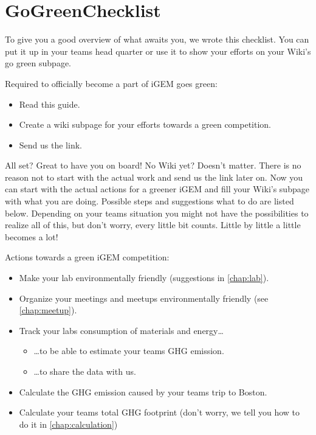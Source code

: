 \section{GoGreenChecklist}\label{checklist}
To give you a good overview of what awaits you, we wrote this checklist. You can put it up in your teams head quarter or use it to show your efforts on your Wiki's go green subpage.
\bigskip
{\renewcommand{\labelitemi}{\tickleaf}
\begin{checklistbox}
{\sffamily\textcolor{ocre}{Required to officially become a part of iGEM goes green:}}
\begin{itemize}
	\setlength{\itemsep}{-0.5\parsep}
	\item[\tickleafticked] Read this guide.
	\item Create a wiki subpage for your efforts towards a green competition.%
	\item Send us the link.
\end{itemize}
\end{checklistbox}
\bigskip
All set? Great to have you on board! No Wiki yet? Doesn't matter. There is no reason not to start with the actual work and send us the link later on. Now you can start with the actual actions for a greener iGEM and fill your Wiki's subpage with what you are doing. Possible steps and suggestions what to do are listed below. Depending on your teams situation you might not have the possibilities to realize all of this, but don't worry, every little bit counts. Little by little a little becomes a lot!
\bigskip
\begin{checklistbox}
{\sffamily\textcolor{ocre}{Actions towards a green iGEM competition:}}
\begin{itemize}
	\setlength{\itemsep}{-0.5\parsep}
	\item Make your lab environmentally friendly (suggestions in \cref{chap:lab}).
	\item Organize your meetings and meetups environmentally friendly (see \cref{chap:meetup}).
	\item Track your labs consumption of materials and energy\dots
	\begin{itemize}
		\item[] \dots to be able to estimate your teams GHG emission.
		\item[] \dots to share the data with us.
	\end{itemize}
	\item Calculate the GHG emission caused by your teams trip to Boston.
	\item Calculate your teams total GHG footprint (don't worry, we tell you how to do it in \cref{chap:calculation})

\end{itemize}
\end{checklistbox}}
